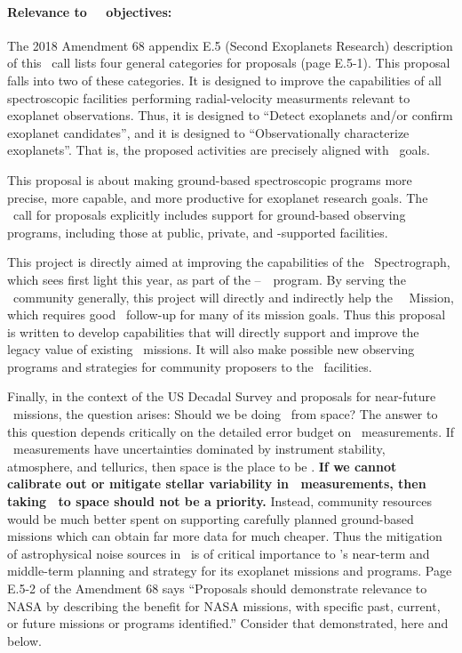 \documentclass[12pt, letterpaper]{article}
\begin{document}
\paragraph{Relevance to \NASA\ \XRP\ objectives:} The 2018 
Amendment 68 appendix E.5 (Second Exoplanets Research) description of this
\XRP\ call lists four general categories for proposals (page
E.5-1).
This proposal falls into two of these categories.
It is designed to improve the capabilities of all spectroscopic
facilities performing radial-velocity measurments relevant to
exoplanet observations.
Thus, it is designed to ``Detect exoplanets and/or confirm exoplanet
candidates'', and it is designed to ``Observationally characterize
exoplanets''.
That is, the proposed activities are precisely aligned with
\XRP\ goals.

This proposal is about making ground-based spectroscopic programs more
precise, more capable, and more productive for exoplanet research
goals.
The \XRP\ call for proposals explicitly includes support for
ground-based observing programs, including those at public, private,
and \NASA-supported facilities.

This project is directly aimed at improving the capabilities of the
\NEID\ Spectrograph, which sees first light this year,
as part of the \NASA--\NSF\ \NNEXPLORE\ program.
By serving the \EPRV\ community generally, this project will
directly and indirectly help the \NASA\ \TESS\ Mission,
which requires good \RV\ follow-up for many of its mission goals.
Thus this proposal is written to develop capabilities that will
directly support and improve the legacy value of existing
\NASA\ missions.
It will also make possible new observing programs and strategies for
community proposers to the \NNEXPLORE\ facilities.

Finally, in the context of the US Decadal Survey and proposals for near-future
\NASA\ missions, the question arises: Should we be doing \EPRV\ from space?
The answer to this question depends critically on the detailed error budget on
\EPRV\ measurements.
If \EPRV\ measurements have uncertainties dominated by instrument
stability, atmosphere, and tellurics, then space is the place to be \citep[e.g.][]{Plavchan2018}.
\textbf{If we cannot calibrate out or mitigate stellar variability
  in \EPRV\ measurements, then taking
  \EPRV\ to space should not be a priority.}
Instead, community resources would be much better spent on supporting 
carefully planned ground-based missions which can obtain far more data 
for much cheaper. 
Thus the mitigation of astrophysical noise sources in \EPRV\ is of critical
importance to \NASA's near-term and middle-term planning and strategy
for its exoplanet missions and programs.
Page E.5-2 of the  Amendment 68 says ``Proposals
should demonstrate relevance to NASA by describing the benefit for
NASA missions, with specific past, current, or future missions or
programs identified.''  Consider that demonstrated, here and below.
\end{document}
